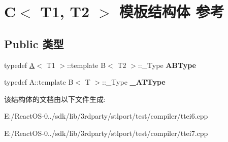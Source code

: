 \hypertarget{struct_c}{}\section{C$<$ T1, T2 $>$ 模板结构体 参考}
\label{struct_c}
\subsection*{Public 类型}
\begin{DoxyCompactItemize}
\item 
\mbox{\label{struct_c_a64c7042f31e9532bc01a9db32adc5265}} 
typedef \hyperlink{struct_a}{A}$<$ T1 $>$\+::template B$<$ T2 $>$\+::\+\_\+\+Type {\bfseries A\+B\+Type}
\item 
\mbox{\label{struct_c_a4a897d09a534a30922a9e933126ac256}} 
typedef A\+::template B$<$ T $>$\+::\+\_\+\+Type {\bfseries \+\_\+\+A\+T\+Type}
\end{DoxyCompactItemize}


该结构体的文档由以下文件生成\+:\begin{DoxyCompactItemize}
\item 
E\+:/\+React\+O\+S-\/0../sdk/lib/3rdparty/stlport/test/compiler/ttei6.\+cpp\item 
E\+:/\+React\+O\+S-\/0../sdk/lib/3rdparty/stlport/test/compiler/ttei7.\+cpp\end{DoxyCompactItemize}
